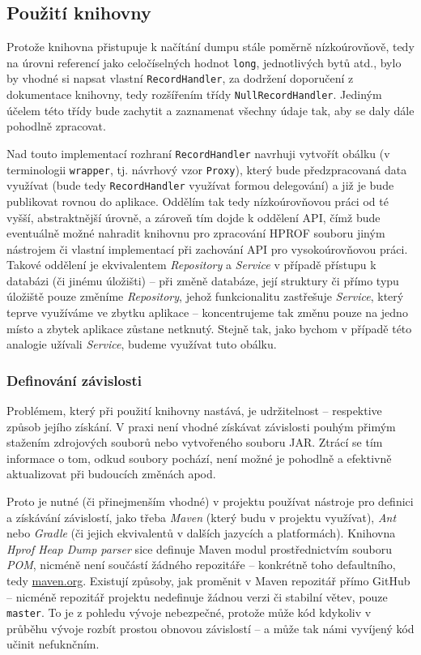\subsection{Použití knihovny}
Protože knihovna přistupuje k načítání dumpu stále poměrně nízkoúrovňově, tedy na úrovni referencí jako celočíselných hodnot \texttt{long}, jednotlivých bytů atd., bylo by vhodné si napsat vlastní \texttt{RecordHandler}, za dodržení doporučení z dokumentace knihovny, tedy rozšířením třídy \texttt{NullRecordHandler}. Jediným účelem této třídy bude zachytit a zaznamenat všechny údaje tak, aby se daly dále pohodlně zpracovat. 

Nad touto implementací rozhraní \texttt{RecordHandler} navrhuji vytvořít obálku (v terminologii \texttt{wrapper}, tj. návrhový vzor \texttt{Proxy}), který bude předzpracovaná data využívat (bude tedy \texttt{RecordHandler} využívat formou delegování) a již je bude publikovat rovnou do aplikace. Oddělím tak tedy nízkoúrovňovou práci od té vyšší, abstraktnější úrovně, a zároveň tím dojde k oddělení API, čímž bude eventuálně možné nahradit knihovnu pro zpracování HPROF souboru jiným nástrojem či vlastní implementací při zachování API pro vysokoúrovňovou práci. Takové oddělení je ekvivalentem \textit{Repository} a \textit{Service} v případě přístupu k databázi (či jinému úložišti) -- při změně databáze, její struktury či přímo typu úložiště pouze změníme \textit{Repository}, jehož funkcionalitu zastřešuje \textit{Service}, který teprve využíváme ve zbytku aplikace -- koncentrujeme tak změnu pouze na jedno místo a zbytek aplikace zůstane netknutý. Stejně tak, jako bychom v případě této analogie užívali \textit{Service}, budeme využívat tuto obálku.

\subsubsection{Definování závislosti}
Problémem, který při použití knihovny nastává, je udržitelnost -- respektive způsob jejího získání. V praxi není vhodné získávat závislosti pouhým přimým stažením zdrojových souborů nebo vytvořeného souboru JAR. Ztrácí se tím informace o tom, odkud soubory pochází, není možné je pohodlně a efektivně aktualizovat při budoucích změnách apod.

Proto je nutné (či přinejmenším vhodné) v projektu používat nástroje pro definici a získávání závislostí, jako třeba \textit{Maven} (který budu v projektu využívat), \textit{Ant} nebo \textit{Gradle} (či jejich ekvivalentů v dalších jazycích a platformách). Knihovna \textit{Hprof Heap Dump parser} sice definuje Maven modul prostřednictvím souboru \textit{POM}, nicméně není součástí žádného repozitáře -- konkrétně toho defaultního, tedy \url{maven.org}. Existují způsoby, jak proměnit v Maven repozitář přímo GitHub -- nicméně repozitář projektu nedefinuje žádnou verzi či stabilní větev, pouze \texttt{master}. To je z pohledu vývoje nebezpečné, protože může kód kdykoliv v průběhu vývoje rozbít prostou obnovou závislostí -- a může tak námi vyvíjený kód učinit nefuknčním.


